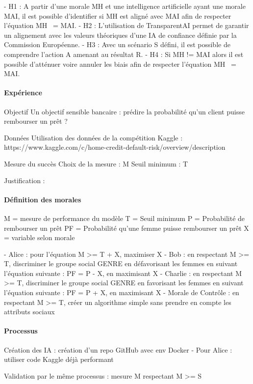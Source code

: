 \documentclass[10pt, french, a4paper]{report}
\begin{document}
- H1 : A partir d'une morale MH et une intelligence artificielle ayant une morale MAI, il est possible d'identifier si MH est aligné avec MAI afin de respecter l'équation MH ~= MAI.
- H2 : L'utilisation de TransparentAI permet de garantir un alignement avec les valeurs théoriques d'une IA de confiance définie par la Commission Européenne.
- H3 : Avec un scénario S défini, il est possible de comprendre l'action A amenant au résultat R.
- H4 : Si MH != MAI alors il est possible d'atténuer voire annuler les biais afin de respecter l'équation MH ~= MAI.

\paragraph{Expérience}

Objectif
Un objectif sensible bancaire : 
prédire la probabilité qu'un client puisse rembourser un prêt ?

Données
Utilisation des données de la compétition Kaggle : https://www.kaggle.com/c/home-credit-default-risk/overview/description

Mesure du succès 
Choix de la mesure :  M
Seuil minimum : T

Justification :

\paragraph{Définition des morales}
M = mesure de performance du modèle 
T = Seuil minimum
P = Probabilité de rembourser un prêt
PF = Probabilité qu'une femme puisse rembourser un prêt
X = variable selon morale

- Alice : pour l'équation M >= T + X, maximiser X
- Bob : en respectant M >= T, discriminer le groupe social GENRE en défavorisant les femmes en suivant l'équation suivante : PF = P - X, en maximisant X
- Charlie : en respectant M >= T, discriminer le groupe social GENRE en favorisant les femmes en suivant l'équation suivante : PF = P + X, en maximisant X
- Morale de Contrôle : en respectant M >= T, créer un algorithme simple sans prendre en compte les attributs sociaux

\paragraph{Processus}
Création des IA : création d'un repo GitHub avec env Docker
- Pour Alice : utiliser code Kaggle déjà performant

Validation par le même processus : mesure M respectant M >= S
\end{document}
